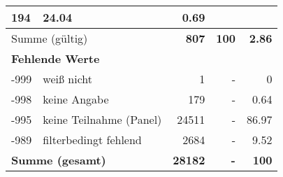 \begin{longtable}{lXrrr}
       \num{194} &
       \num[round-mode=places,round-precision=2]{24.04} &
         \num[round-mode=places,round-precision=2]{0.69} \\
     \midrule
     \multicolumn{2}{l}{Summe (gültig)} &
       \textbf{\num{807}} &
     \textbf{\num{100}} &
       \textbf{\num[round-mode=places,round-precision=2]{2.86}} \\
     \multicolumn{5}{l}{\textbf{Fehlende Werte}}\\
       -999 &
       weiß nicht &
         \num{1} &
        - &
         \num[round-mode=places,round-precision=2]{0} \\
       -998 &
       keine Angabe &
         \num{179} &
        - &
         \num[round-mode=places,round-precision=2]{0.64} \\
       -995 &
       keine Teilnahme (Panel) &
         \num{24511} &
        - &
         \num[round-mode=places,round-precision=2]{86.97} \\
       -989 &
       filterbedingt fehlend &
         \num{2684} &
        - &
         \num[round-mode=places,round-precision=2]{9.52} \\
     \midrule
     \multicolumn{2}{l}{\textbf{Summe (gesamt)}} &
          \textbf{\num{28182}} &
        \textbf{-} &
        \textbf{\num{100}} \\
     \bottomrule
     \end{longtable}
     
